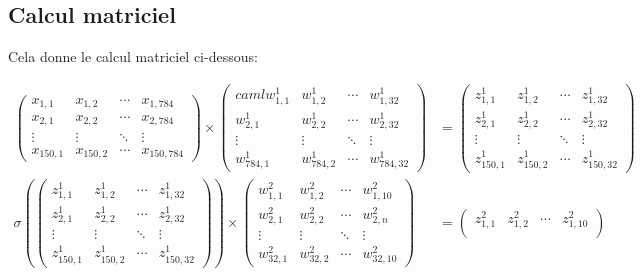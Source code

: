 \documentclass[11pt]{book}
\begin{document}
\subsection{Calcul matriciel}

Cela donne le calcul matriciel ci-dessous:
\begin{footnotesize}
\begin{align*}
\begin{pmatrix}
x_{1,1} & x_{1,2} & \cdots & x_{1,784} \\
x_{2,1} & x_{2,2} & \cdots & x_{2,784} \\
\vdots  & \vdots  & \ddots & \vdots  \\
x_{150,1} & x_{150,2} & \cdots & x_{150,784} 
\end{pmatrix}
\times
\begin{pmatrix}caml
w^1_{1,1} & w^1_{1,2} & \cdots & w^1_{1,32} \\
w^1_{2,1} & w^1_{2,2} & \cdots & w^1_{2,32} \\
\vdots  & \vdots  & \ddots & \vdots  \\
w^1_{784,1} & w^1_{784,2} & \cdots & w^1_{784,32} 
\end{pmatrix}
&= 
\begin{pmatrix}
z^1_{1,1} & z^1_{1,2} & \cdots & z^1_{1,32} \\
z^1_{2,1} & z^1_{2,2} & \cdots & z^1_{2,32} \\
\vdots  & \vdots  & \ddots & \vdots  \\
z^1_{150,1} & z^1_{150,2} & \cdots & z^1_{150,32} 
\end{pmatrix}
\\
\sigma(
\begin{pmatrix}
z^1_{1,1} & z^1_{1,2} & \cdots & z^1_{1,32} \\
z^1_{2,1} & z^1_{2,2} & \cdots & z^1_{2,32} \\
\vdots  & \vdots  & \ddots & \vdots  \\
z^1_{150,1} & z^1_{150,2} & \cdots & z^1_{150,32} 
\end{pmatrix}
)
\times
\begin{pmatrix}
w^2_{1,1} & w^2_{1,2} & \cdots & w^2_{1,10} \\
w^2_{2,1} & w^2_{2,2} & \cdots & w^2_{2,n} \\
\vdots  & \vdots  & \ddots & \vdots  \\
w^2_{32,1} & w^2_{32,2} & \cdots & w^2_{32,10} 
\end{pmatrix}
&= 
\begin{pmatrix}
z^2_{1,1} & z^2_{1,2} & \cdots & z^2_{1,10} \\

\end{pmatrix}
\end{align*}
\end{footnotesize}
\end{document}
